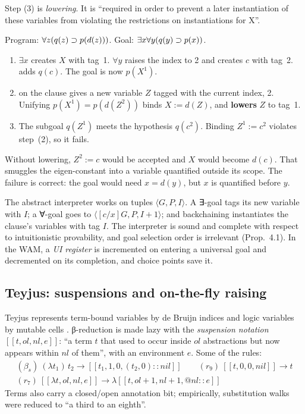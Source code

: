 Step (3) is \emph{lowering}. It is \enquote{required in order to prevent a later instantiation of
these variables from violating the restrictions on instantiations for X}.

\begin{tutorial}
Program: $\forall z(q(z)\supset p(d(z)))$. Goal: $\exists x\forall y(q(y)\supset p(x))$.
\begin{enumerate}
  \item $\exists x$ creates $X$ with tag~1. $\forall y$ raises the index to 2 and creates $c$ with
    tag~2.  adds $q(c)$. The goal is now $p(X^1)$.
  \item {} on the clause gives a new variable $Z$ tagged with the current index, 2.
    Unifying $p(X^1)=p(d(Z^2))$ binds $X:=d(Z)$, and \textbf{lowers} $Z$ to tag~1.
  \item The subgoal $q(Z^1)$ meets the hypothesis $q(c^2)$. Binding $Z^1:=c^2$ violates step~(2), so
    it fails.
\end{enumerate}
Without lowering, $Z^2:=c$ would be accepted and $X$ would become $d(c)$. That smuggles the
eigen-constant into a variable quantified outside its scope. The failure is correct: the goal would
need $x=d(y)$, but $x$ is quantified before $y$.
\end{tutorial}

The abstract interpreter works on tuples $\langle G,P,I\rangle$. A ∃-goal tags its new variable with
$I$; a ∀-goal goes to $\langle[c/x]G,P,I{+}1\rangle$; and backchaining instantiates the clause's
variables with tag $I$. The interpreter is sound and complete with respect to intuitionistic
provability, and goal selection order is irrelevant (Prop.~4.1). In the WAM, a \emph{UI register} is
incremented on entering a universal goal and decremented on its completion, and choice points save
it.

\subsection{Teyjus: suspensions and on-the-fly raising}

Teyjus represents term-bound variables by de Bruijn indices and logic variables by mutable cells
\cite{Nadathur2005}. β-reduction is made lazy with the \emph{suspension notation}
$[[t,ol,nl,e]]$: \enquote{a term $t$ that used to occur inside $ol$ abstractions but now appears within
$nl$ of them}, with an environment $e$. Some of the rules:
\begin{gather*}
  (\beta_s)\ (\lambda t_1)\,t_2\to[[t_1,1,0,(t_2,0)::nil]]\qquad
  (r_9)\ [[t,0,0,nil]]\to t\\
  (r_7)\ [[\lambda t,ol,nl,e]]\to\lambda[[t,ol{+}1,nl{+}1,@nl::e]]
\end{gather*}
Terms also carry a closed/open annotation bit; empirically, substitution walks were reduced to
\enquote{a third to an eighth}.

